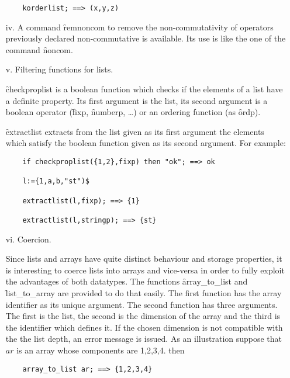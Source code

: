 \begin{itemize}
\begin{verbatim}
    korderlist; ==> (x,y,z)
\end{verbatim}

\item[iv.]
  \hypertarget{command:REMNONCOM}{}
  A command \f{remnoncom} to remove the non-commutativity of 
operators previously declared non-commutative is available. Its use is like 
the one of the command \f{noncom}.

\item[v.] Filtering functions for lists.

  \hypertarget{operator:CHECKPROPLIST}{}
\f{checkproplist}  is a  boolean function which checks if the
elements of a list have a definite property. Its first argument
is the list, its second argument is a boolean operator
(\f{fixp}, \f{numberp}, \ldots) or an ordering function (as \f{ordp}).

  \hypertarget{operator:EXTRACTLIST}{}
\f{extractlist} extracts from the list given as its first argument
the elements which satisfy the boolean function given as its second
argument. For example:
\begin{verbatim}
    if checkproplist({1,2},fixp) then "ok"; ==> ok

    l:={1,a,b,"st")$

    extractlist(l,fixp); ==> {1}

    extractlist(l,stringp); ==> {st}
\end{verbatim}
\item[vi.] Coercion.

\hypertarget{operator:ARRAY_TO_LIST}{}
\hypertarget{operator:LIST_TO_ARRAY}{}
Since lists and arrays have quite distinct behaviour and storage properties,  
it is interesting to coerce lists into arrays and vice-versa in order to 
fully exploit the advantages of both datatypes. The functions  
\f{array\_to\_list} and \f{list\_to\_array} are provided to do that easily.
The first function has the array identifier as its unique argument. 
The second
function has three arguments. The first is the list, the second is the 
dimension of the array and the third is the identifier which defines it.  
If the chosen dimension is not compatible with the
the list depth, an error message is issued.  
As an illustration suppose that $ar$ is an array whose components are  
1,2,3,4. then
\begin{verbatim}
    array_to_list ar; ==> {1,2,3,4}


\end{verbatim}
\end{itemize}
